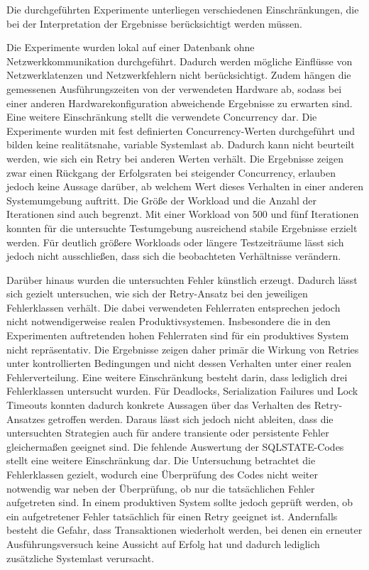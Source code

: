 
Die durchgeführten Experimente unterliegen verschiedenen Einschränkungen, die bei der
Interpretation der Ergebnisse berücksichtigt werden müssen.

Die Experimente wurden lokal auf einer Datenbank ohne Netzwerkkommunikation durchgeführt.
Dadurch werden mögliche Einflüsse von Netzwerklatenzen und Netzwerkfehlern nicht berücksichtigt.
Zudem hängen die gemessenen Ausführungszeiten von der verwendeten Hardware ab, sodass bei einer anderen
Hardwarekonfiguration abweichende Ergebnisse zu erwarten sind.
Eine weitere Einschränkung stellt die verwendete Concurrency dar.
Die Experimente wurden mit fest definierten Concurrency-Werten durchgeführt und bilden keine realitätsnahe, variable
Systemlast ab.
Dadurch kann nicht beurteilt werden, wie sich ein Retry bei anderen Werten verhält.
Die Ergebnisse zeigen zwar einen Rückgang der Erfolgsraten bei steigender Concurrency, erlauben jedoch keine Aussage
darüber, ab welchem Wert dieses Verhalten in einer anderen Systemumgebung auftritt.
Die Größe der Workload und die Anzahl der Iterationen sind auch begrenzt.
Mit einer Workload von 500 und fünf Iterationen konnten für die untersuchte Testumgebung ausreichend stabile
Ergebnisse erzielt werden.
Für deutlich größere Workloads oder längere Testzeiträume lässt sich jedoch nicht ausschließen, dass sich die
beobachteten Verhältnisse verändern.

Darüber hinaus wurden die untersuchten Fehler künstlich erzeugt.
Dadurch lässt sich gezielt untersuchen, wie sich der Retry-Ansatz bei den jeweiligen Fehlerklassen verhält.
Die dabei verwendeten Fehlerraten entsprechen jedoch nicht notwendigerweise realen
Produktivsystemen.
Insbesondere die in den Experimenten auftretenden hohen Fehlerraten sind für ein produktives System nicht
repräsentativ.
Die Ergebnisse zeigen daher primär die Wirkung von Retries unter kontrollierten Bedingungen und nicht
dessen Verhalten unter einer realen Fehlerverteilung.
Eine weitere Einschränkung besteht darin, dass lediglich drei Fehlerklassen untersucht wurden.
Für Deadlocks, Serialization Failures und Lock Timeouts konnten dadurch konkrete Aussagen über das Verhalten des
Retry-Ansatzes getroffen werden.
Daraus lässt sich jedoch nicht ableiten, dass die untersuchten Strategien auch für andere transiente oder
persistente Fehler gleichermaßen geeignet sind.
Die fehlende Auswertung der SQLSTATE-Codes stellt eine weitere Einschränkung dar.
Die Untersuchung betrachtet die Fehlerklassen gezielt, wodurch eine Überprüfung des Codes nicht weiter notwendig
war neben der Überprüfung, ob nur die tatsächlichen Fehler aufgetreten sind.
In einem produktiven System sollte jedoch geprüft werden, ob ein aufgetretener Fehler tatsächlich für einen Retry
geeignet ist.
Andernfalls besteht die Gefahr, dass Transaktionen wiederholt werden, bei denen ein erneuter Ausführungsversuch
keine Aussicht auf Erfolg hat und dadurch lediglich zusätzliche Systemlast verursacht.

